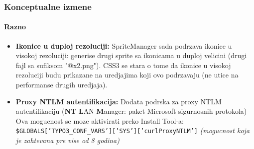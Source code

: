 \begin{frame}[fragile]
	\frametitle{Konceptualne izmene}
	\framesubtitle{Razno}

	\begin{itemize}

		\item \textbf{Ikonice u duploj rezoluciji:}\newline
			\small
				SpriteManager sada podrzava ikonice u visokoj rezoluciji: generise drugi sprite sa ikonicama u duploj velicini (drugi fajl sa sufiksom "@x2.png"). CSS3 se stara o tome da ikonice u visokoj rezoluciji budu prikazane na uredjajima koji ovo podrzavaju\newline
				(ne utice na performanse drugih uredjaja).
			\normalsize

		\item \textbf{Proxy NTLM autentifikacija:}\newline
			\small
				Dodata podrska za proxy NTLM autentifikaciju (\textbf{NT} \textbf{L}AN \textbf{M}anager: paket Microsoft sigurnosnih protokola) Ova mogucnost se moze aktivirati preko Install Tool-a:\newline
			\normalsize
			\smaller
				\texttt{\$GLOBALS['TYPO3\_CONF\_VARS']['SYS']['curlProxyNTLM']}\newline
				\emph{(mogucnost koja je zahtevana pre vise od 8 godina)}
			\normalsize

	\end{itemize}
	
\end{frame}


